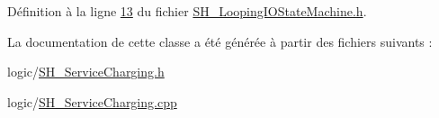Définition à la ligne \hyperlink{SH__LoopingIOStateMachine_8h_source_l00013}{13} du fichier \hyperlink{SH__LoopingIOStateMachine_8h_source}{S\-H\-\_\-\-Looping\-I\-O\-State\-Machine.\-h}.



La documentation de cette classe a été générée à partir des fichiers suivants \-:\begin{DoxyCompactItemize}
\item 
logic/\hyperlink{SH__ServiceCharging_8h}{S\-H\-\_\-\-Service\-Charging.\-h}\item 
logic/\hyperlink{SH__ServiceCharging_8cpp}{S\-H\-\_\-\-Service\-Charging.\-cpp}\end{DoxyCompactItemize}
